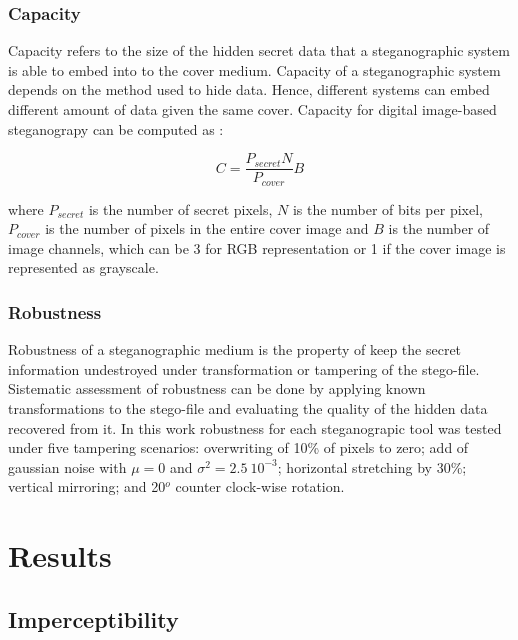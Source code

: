 \documentclass[11pt]{article}
\begin{document}
\subsubsection{Capacity}

Capacity refers to the size of the hidden secret data that a steganographic system is able to embed into to the cover
medium. Capacity of a steganographic system depends on the method used to hide data. Hence, different systems can embed
different amount of data given the same cover. Capacity for digital image-based steganograpy can be computed as \cite{Shih-Book}:

\begin{equation}
 C = \frac{P_{secret}N}{P_{cover}} B
 \label{Eq:Capacity}
\end{equation}

\noindent where $P_{secret}$ is the number of secret pixels, $N$ is the number of bits per pixel, $P_{cover}$ is the 
number of pixels in the entire cover image and $B$ is the number of image channels, which can be 3 for RGB representation
or 1 if the cover image is represented as grayscale.



\subsubsection{Robustness}
\label{Subsubsec:Robustness}

Robustness of a steganographic medium is the property of keep the secret information undestroyed under transformation or 
tampering of the stego-file. Sistematic assessment of robustness can be done by applying known transformations to the stego-file
and evaluating the quality of the hidden data recovered from it. In this work robustness for each steganograpic tool 
was tested under five tampering scenarios: overwriting of 10\% of pixels to zero; add of gaussian noise with $\mu = 0$ and $\sigma^2 = 2.5\ 10^{-3}$; horizontal
stretching by 30\%; vertical mirroring; and 20$^o$ counter clock-wise rotation.


\section{Results}


\subsection{Imperceptibility}
\end{document}
